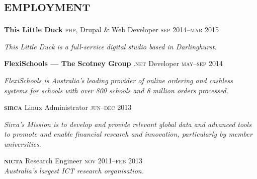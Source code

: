 
\vspace{-0.6cm}
\section*{\textsc{employment}}
\vspace{-0.2cm}

\textbf{This Little Duck}\phantom{..} \textsc{php}, Drupal \& Web Developer
 \hfill \textsc{sep} 2014--\textsc{mar} 2015\\
\begin{minipage}[t]{0.70\textwidth}
{
\textit{This Little Duck is a full-service digital studio based in Darlinghurst.}
\par}
\end{minipage}

\textbf{FlexiSchools --- The Scotney Group}\phantom{..} \textsc{.net} Developer 
\hfill \textsc{may}--\textsc{sep} 2014\\
\begin{minipage}[t]{0.75\textwidth}
{
\textit{FlexiSchools is Australia’s leading provider of online ordering and cashless systems for schools with over 800 schools and 8 million orders processed. }
\par}
\end{minipage}

\textbf{\textsc{sirca}}\phantom{..} Linux Administrator
\hfill \textsc{jun}--\textsc{dec} 2013\\
\begin{minipage}[t]{0.75\textwidth}
{
\textit{Sirca’s Mission is to develop and provide relevant global data and advanced tools to promote and enable financial research and innovation, particularly by member universities.}
\par}
\end{minipage}

\textbf{\textsc{nicta}}\phantom{..} Research Engineer \hfill \textsc{nov} 2011--\textsc{feb} 2013\\
\textit{Australia's largest ICT research organisation.}



